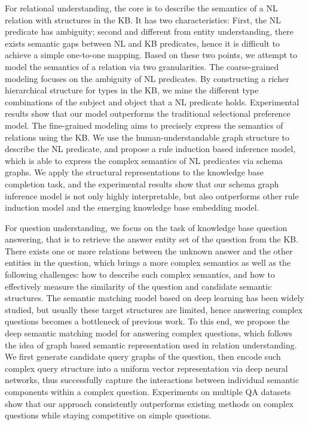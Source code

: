 \begin{englishabstract}
For relational understanding, the core is to describe the semantics of a 
NL relation with structures in the KB.
It has two characteristics: First, the NL predicate has ambiguity; 
second and different from entity understanding,
there exists semantic gaps between NL and KB predicates,
hence it is difficult to achieve a simple one-to-one mapping.
Based on these two points, we attempt to model the semantics of a relation via two granularities.
The coarse-grained modeling focuses on the ambiguity of NL predicates.
By constructing a richer hierarchical structure for types in the KB, 
we mine the different type combinations of the subject and object that a NL predicate holds.
Experimental results show that our model outperforms the traditional selectional preference model.
The fine-grained modeling aims to precisely express the semantics of relations using the KB.
We use the human-understandable graph structure to describe the NL predicate,
and propose a rule induction based inference model, 
which is able to express the complex semantics of NL predicates via schema graphs.
We apply the structural representations to the knowledge base completion task,
and the experimental results show that our schema graph inference model
is not only highly interpretable,
but also outperforms other rule induction model and the emerging knowledge base embedding model.

For question understanding, we focus on the task of knowledge base question answering,
that is to retrieve the answer entity set of the question from the KB.
There exists one or more relations between the unknown answer
and the other entities in the question, 
which brings a more complex semantics as well as the following challenges:
how to describe such complex semantics, and how to effectively
measure the similarity of the question and candidate semantic structures.
The semantic matching model based on deep learning has been widely studied,
but usually these target structures are limited, hence
answering complex questions becomes a bottleneck of previous work.
To this end, we propose the deep semantic matching model for answering complex questions,
which follows the idea of graph based semantic representation used in relation understanding.
We first generate candidate query graphs of the question,
then encode such complex query structure into a uniform vector representation
via deep neural networks, thus successfully capture the interactions between
individual semantic components within a complex question.
Experiments on multiple QA datasets show that our approach
consistently outperforms existing methods on complex questions
while staying competitive on simple questions.


\end{englishabstract}
